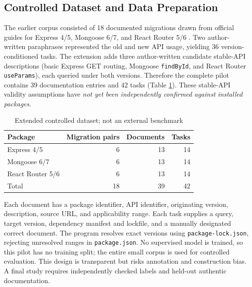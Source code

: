 \documentclass[conference]{IEEEtran}
\begin{document}
\subsection{Controlled Dataset and Data Preparation}
The earlier corpus consisted of 18 documented migrations drawn from official guides for Express 4/5, Mongoose 6/7, and React Router 5/6 \cite{express,mongoose,router}. Two author-written paraphrases represented the old and new API usage, yielding 36 version-conditioned tasks. The extension adds three author-written candidate stable-API descriptions (basic Express GET routing, Mongoose \texttt{findById}, and React Router \texttt{useParams}), each queried under both versions. Therefore the complete pilot contains 39 documentation entries and 42 tasks (Table \ref{tab:data}). These stable-API validity assumptions have \emph{not yet been independently confirmed against installed packages}.

\begin{table}[t]
\centering
\caption{Extended controlled dataset; not an external benchmark}
\label{tab:data}
\begin{tabular}{lrrr}
\toprule
Package & Migration pairs & Documents & Tasks\\
\midrule
Express 4/5 & 6 & 13 & 14\\
Mongoose 6/7 & 6 & 13 & 14\\
React Router 5/6 & 6 & 13 & 14\\
\midrule
Total & 18 & 39 & 42\\
\bottomrule
\end{tabular}
\end{table}

Each document has a package identifier, API identifier, originating version, description, source URL, and applicability range. Each task supplies a query, target version, dependency manifest and lockfile, and a manually designated correct document. The program resolves exact versions using \texttt{package-lock.json}, rejecting unresolved ranges in \texttt{package.json}. No supervised model is trained, so this pilot has no training split; the entire small corpus is used for controlled evaluation. This design is transparent but risks annotation and construction bias. A final study requires independently checked labels and held-out authentic documentation.
\end{document}
